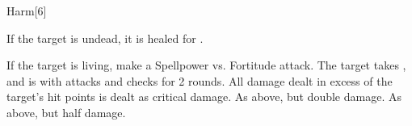 \begin{spellsection}{Harm}[6]
    \begin{spellheader}
    \end{spellheader}
    \begin{spellcontent}
        \begin{spelltargetinginfo}
        \end{spelltargetinginfo}
        \begin{spelleffects}
            \spelleffect If the target is undead, it is healed for \spelldamage{}.
            \begin{spellattacktriggered}{If the target is living, make a Spellpower vs. Fortitude attack.}
                \spellsuccess The target takes , and is \impaired with attacks and checks for 2 rounds. All damage dealt in excess of the target's hit points is dealt as critical damage.
                \spellcritical As above, but double damage.
                \spellfailure As above, but half damage.
            \end{spellattacktriggered}
        \end{spelleffects}
    \end{spellcontent}
    \begin{spellfooter}
        \miscastrandom
    \end{spellfooter}
    \begin{spellaugments}
    \end{spellaugments}
\end{spellsection}

